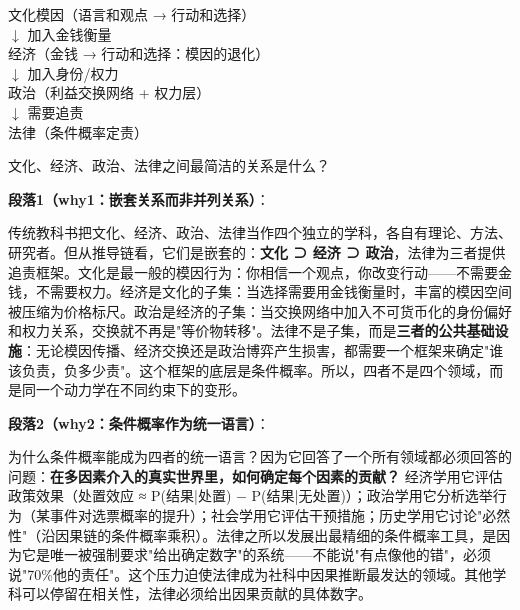 \documentclass[../main.tex]{subfiles}
\begin{document}
	\begin{logicmap}

		文化模因（语言和观点 → 行动和选择）\\

		$\downarrow$ 加入金钱衡量\\

		经济（金钱 → 行动和选择：模因的退化）\\

		$\downarrow$ 加入身份/权力\\

		政治（利益交换网络 + 权力层）\\

		$\downarrow$ 需要追责\\

		法律（条件概率定责）

	\end{logicmap}

	\begin{questionbox}

		文化、经济、政治、法律之间最简洁的关系是什么？

	\end{questionbox}

	\textbf{段落1（why1：嵌套关系而非并列关系）}：  

	传统教科书把文化、经济、政治、法律当作四个独立的学科，各自有理论、方法、研究者。但从推导链看，它们是嵌套的：\textbf{文化 ⊃ 经济 ⊃ 政治}，法律为三者提供追责框架。文化是最一般的模因行为：你相信一个观点，你改变行动——不需要金钱，不需要权力。经济是文化的子集：当选择需要用金钱衡量时，丰富的模因空间被压缩为价格标尺。政治是经济的子集：当交换网络中加入不可货币化的身份偏好和权力关系，交换就不再是"等价物转移"。法律不是子集，而是\textbf{三者的公共基础设施}：无论模因传播、经济交换还是政治博弈产生损害，都需要一个框架来确定"谁该负责，负多少责"。这个框架的底层是条件概率。所以，四者不是四个领域，而是同一个动力学在不同约束下的变形。

	\textbf{段落2（why2：条件概率作为统一语言）}：  

	为什么条件概率能成为四者的统一语言？因为它回答了一个所有领域都必须回答的问题：\textbf{在多因素介入的真实世界里，如何确定每个因素的贡献？} 经济学用它评估政策效果（处置效应 ≈ P(结果|处置) − P(结果|无处置)）；政治学用它分析选举行为（某事件对选票概率的提升）；社会学用它评估干预措施；历史学用它讨论"必然性"（沿因果链的条件概率乘积）。法律之所以发展出最精细的条件概率工具，是因为它是唯一被强制要求"给出确定数字"的系统——不能说"有点像他的错"，必须说"70\%他的责任"。这个压力迫使法律成为社科中因果推断最发达的领域。其他学科可以停留在相关性，法律必须给出因果贡献的具体数字。
\end{document}
